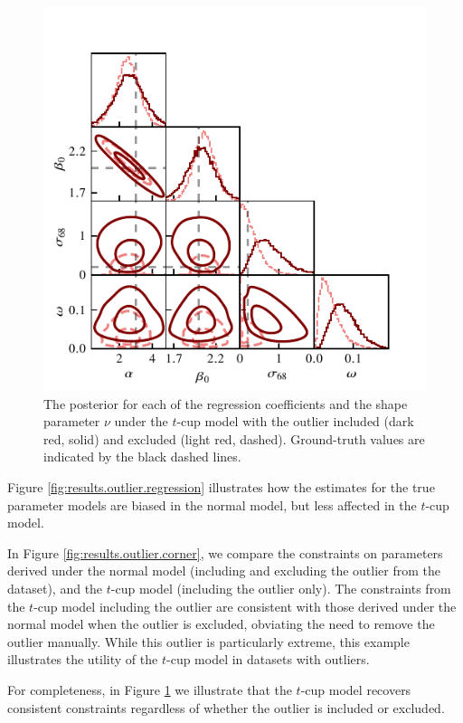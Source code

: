 \documentclass[fleqn,usenatbib]{rasti}
\begin{document}
\begin{figure}
    \includegraphics[width=\columnwidth]{graphics/fixed/corner_outlier_tcup.pdf}
    \caption{The posterior for each of the regression coefficients and the shape
    parameter $\nu$ under the $t$-cup model with the outlier included (dark red,
    solid) and excluded (light red, dashed). Ground-truth values are indicated
    by the black dashed lines.}
    \label{fig:results.outlier.tcup}
\end{figure}

Figure \ref{fig:results.outlier.regression} illustrates how the estimates for
the true parameter models are biased in the normal model, but less affected in
the $t$-cup model.

In Figure \ref{fig:results.outlier.corner}, we compare the constraints on
parameters derived under the normal model (including and excluding the outlier
from the dataset), and the $t$-cup model (including the outlier only). The
constraints from the $t$-cup model including the outlier are consistent with
those derived under the normal model when the outlier is excluded, obviating the
need to remove the outlier manually. While this outlier is particularly extreme,
this example illustrates the utility of the $t$-cup model in datasets with
outliers.

For completeness, in Figure \ref{fig:results.outlier.tcup} we illustrate that
the $t$-cup model recovers consistent constraints regardless of whether the
outlier is included or excluded.
\end{document}

